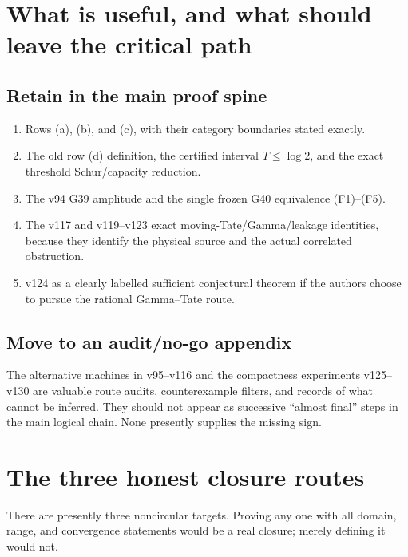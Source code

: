 \documentclass[11pt]{article}
\begin{document}
\section{What is useful, and what should leave the critical path}

\subsection*{Retain in the main proof spine}
\begin{enumerate}
\item Rows (a), (b), and (c), with their category boundaries stated exactly.
\item The old row (d) definition, the certified interval \(T\leq\log2\), and the
      exact threshold Schur/capacity reduction.
\item The v94 G39 amplitude and the single frozen G40 equivalence
      (F1)--(F5).
\item The v117 and v119--v123 exact moving-Tate/Gamma/leakage identities, because
      they identify the physical source and the actual correlated obstruction.
\item v124 as a clearly labelled sufficient conjectural theorem if the authors
      choose to pursue the rational Gamma--Tate route.
\end{enumerate}

\subsection*{Move to an audit/no-go appendix}
The alternative machines in v95--v116 and the compactness experiments v125--v130
are valuable route audits, counterexample filters, and records of what cannot be
inferred.  They should not appear as successive ``almost final'' steps in the main
logical chain.  None presently supplies the missing sign.

\section{The three honest closure routes}

There are presently three noncircular targets.  Proving any one with all domain,
range, and convergence statements would be a real closure; merely defining it
would not.
\end{document}
